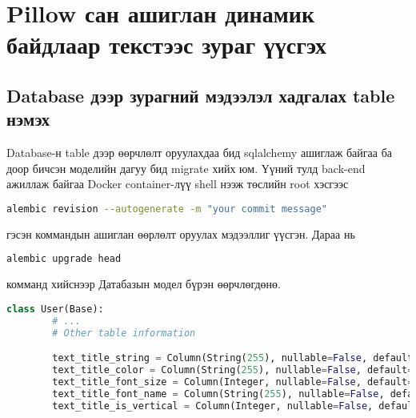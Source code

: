 \section{Pillow сан ашиглан динамик байдлаар текстээс зураг үүсгэх}
\subsection{Database дээр зурагний мэдээлэл хадгалах table нэмэх}
Database-н table дээр өөрчлөлт оруулахдаа бид sqlalchemy ашиглаж байгаа ба доор бичсэн моделийн дагуу бид migrate хийх юм. Үүний тулд back-end ажиллаж байгаа Docker container-лүү shell нээж төслийн root хэсгээс
\begin{lstlisting}[language=bash]
	alembic revision --autogenerate -m "your commit message"
\end{lstlisting}
гэсэн коммандын ашиглан өөрлөлт оруулах мэдээллиг үүсгэн. Дараа нь
\begin{lstlisting}[language=bash]
	alembic upgrade head
\end{lstlisting}
комманд хийснээр Датабазын модел бүрэн өөрчлөгдөнө.

\begin{lstlisting}[language=Python,caption={Table-рүү оруулсан өөрчлөлт},frame=single]
	class User(Base):
		# ...
		# Other table information

		text_title_string = Column(String(255), nullable=False, default="")
		text_title_color = Column(String(255), nullable=False, default="#000000")
		text_title_font_size = Column(Integer, nullable=False, default=0)
		text_title_font_name = Column(String(255), nullable=False, default="")
		text_title_is_vertical = Column(Integer, nullable=False, default=0)
	\end{lstlisting}

